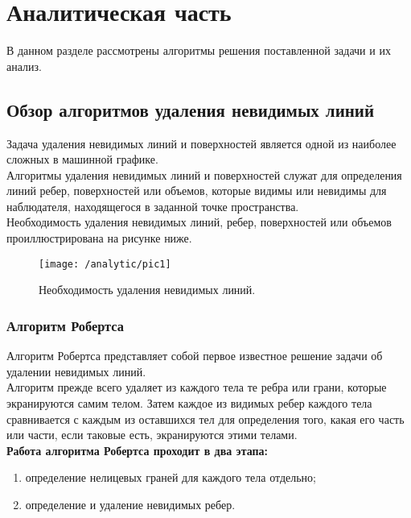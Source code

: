 \newpage
\section{Аналитическая часть}\label{sec:analytic}

В данном разделе рассмотрены алгоритмы решения поставленной задачи и их анализ.

\subsection{Обзор алгоритмов удаления невидимых линий}\label{subsec:analytic1.1}
 
Задача удаления невидимых линий и поверхностей является одной из наиболее сложных в машинной графике.\\

Алгоритмы удаления невидимых линий и поверхностей служат для определения линий ребер, поверхностей или объемов, которые видимы или невидимы для наблюдателя, находящегося в заданной точке пространства.\\

Необходимость удаления невидимых линий, ребер, поверхностей или объемов проиллюстрирована на рисунке ниже.

\begin{figure}[H]
\center
\texttt{[image: /analytic/pic1]}
\caption{Необходимость удаления невидимых линий.}
\end{figure}

\subsubsection{Алгоритм Робертса}\label{subsec:analytic1.1.1}

Алгоритм Робертса представляет собой первое известное решение задачи об удалении невидимых линий.\\

Алгоритм прежде всего удаляет из каждого тела те ребра или грани, которые экранируются самим телом. Затем каждое из видимых ребер каждого тела сравнивается с каждым из оставшихся тел для определения того, какая его часть или части, если таковые есть, экранируются этими телами.\\

\textbf{Работа алгоритма Робертса проходит в два этапа:}

\begin{enumerate}
	\item определение нелицевых граней для каждого тела отдельно;
	\item определение и удаление невидимых ребер.
\end{enumerate}

